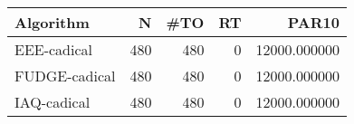 \begin{tabular}{lrrrr}
\toprule
Algorithm & N & #TO & RT & PAR10 \\
\midrule
EEE-cadical & 480 & 480 & 0 & 12000.000000 \\
FUDGE-cadical & 480 & 480 & 0 & 12000.000000 \\
IAQ-cadical & 480 & 480 & 0 & 12000.000000 \\
\bottomrule
\end{tabular}
